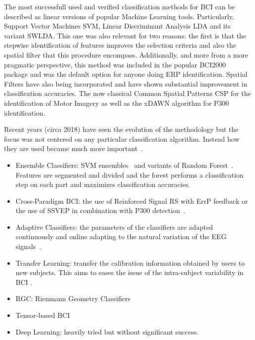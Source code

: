 The most successfull used and verified classification methods for BCI \cite{Lotte2007} can be described as linear versions of popular Machine Learning tools.  Particularly, Support Vector Machines SVM, Linear Discriminant Analysis LDA and its variant SWLDA.  This one was also relevant for two reasons:  the first is that the stepwise identification of features improves the selection criteria and also the spatial filter that this procedure encompass.  Additionally, and more from a more pragmatic perspective, this method was included in the popular BCI2000~\cite{Schalk2004} package and was the default option for anyone doing ERP identification.  Spatial Filters have also being incorporated and have shown substantial improvement in classification accuracies.  The now classical Common Spatial Patterns CSP for the identification of Motor Imagery as well as the xDAWN algorithm for P300 identification.

Recent years (circa 2018) have seen the evolution of the methodology but the focus was not centered on any particular classification algorithm.  Instead how they are used became much more important~\cite{Lotte2018}.

\begin{itemize}
\item Ensemble Classifiers: SVM ensembles~\cite{Rakotomamonjy2008} and variants of Random Forest~\cite{Steyrl2015}.  Features are segmented and divided and the forest performs a classification step on each part and maximizes classification accuracies.
\item Cross-Paradigm BCI: the use of Reinforced Signal RS with ErrP feedback or the use of SSVEP in combination with P300 detection~\cite{Lotte2018}.
\item Adaptive Classifiers: the parameters of the classifiers are adapted continuously and online adapting to the natural variation of the EEG signals~\cite{Lotte2018}.
\item Transfer Learning: transfer the calibration information obtained by users to new subjects.  This aims to eases the issue of the intra-subject variability in BCI .
\item RGC: Rienmann Geometry Classifiers
\item Tensor-based BCI
\item Deep Learning: heavily tried but without significant success.
\end{itemize}


